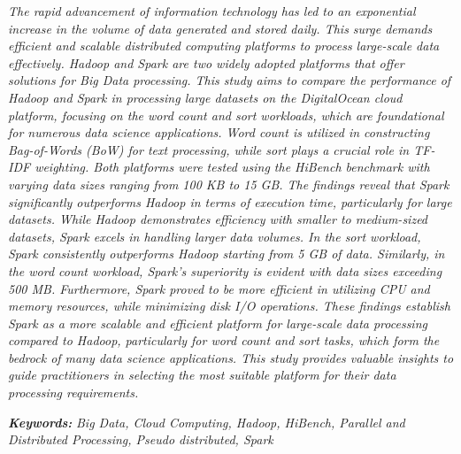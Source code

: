\begin{abstracteng}
\justifying
\emph{The rapid advancement of information technology has led to an exponential increase in the volume of data generated and stored daily. This surge demands efficient and scalable distributed computing platforms to process large-scale data effectively. Hadoop and Spark are two widely adopted platforms that offer solutions for Big Data processing. This study aims to compare the performance of Hadoop and Spark in processing large datasets on the DigitalOcean cloud platform, focusing on the word count and sort workloads, which are foundational for numerous data science applications. Word count is utilized in constructing Bag-of-Words (BoW) for text processing, while sort plays a crucial role in TF-IDF weighting. Both platforms were tested using the HiBench benchmark with varying data sizes ranging from 100 KB to 15 GB. The findings reveal that Spark significantly outperforms Hadoop in terms of execution time, particularly for large datasets. While Hadoop demonstrates efficiency with smaller to medium-sized datasets, Spark excels in handling larger data volumes. In the sort workload, Spark consistently outperforms Hadoop starting from 5 GB of data. Similarly, in the word count workload, Spark's superiority is evident with data sizes exceeding 500 MB. Furthermore, Spark proved to be more efficient in utilizing CPU and memory resources, while minimizing disk I/O operations. These findings establish Spark as a more scalable and efficient platform for large-scale data processing compared to Hadoop, particularly for word count and sort tasks, which form the bedrock of many data science applications. This study provides valuable insights to guide practitioners in selecting the most suitable platform for their data processing requirements.}

\bigskip
\noindent
\textbf{\emph{Keywords:}} \emph{Big Data, Cloud Computing, Hadoop, HiBench, Parallel and Distributed Processing, Pseudo distributed, Spark}
\end{abstracteng}
